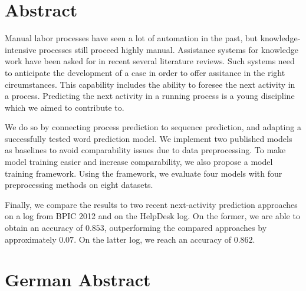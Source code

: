 


\begingroup
\let\clearpage\relax
\let\cleardoublepage\relax
\let\cleardoublepage\relax

\chapter*{Abstract}
Manual labor processes have seen a lot of automation in the past, but knowledge-intensive processes still proceed highly manual.
Assistance systems for knowledge work have been asked for in recent several literature reviews.
Such systems need to anticipate the development of a case in order to offer assitance in the right circumstances.
This capability includes the ability to foresee the next activity in a process.
Predicting the next activity in a running process is a young discipline which we aimed to contribute to.

We do so by connecting process prediction to sequence prediction, and adapting a successfully tested word prediction model.
We implement two published models as baselines to avoid comparability issues due to data preprocessing.
To make model training easier and increase comparability, we also propose a model training framework.
Using the framework, we evaluate four models with four preprocessing methods on eight datasets.

Finally, we compare the results to two recent next-activity prediction approaches on a log from BPIC 2012 and on the HelpDesk log.
On the former, we are able to obtain an accuracy of $0.853$, outperforming the compared approaches by approximately $0.07$.
On the latter log, we reach an accuracy of $0.862$.
\vfill

\chapter*{German Abstract}

\endgroup

\vfill
